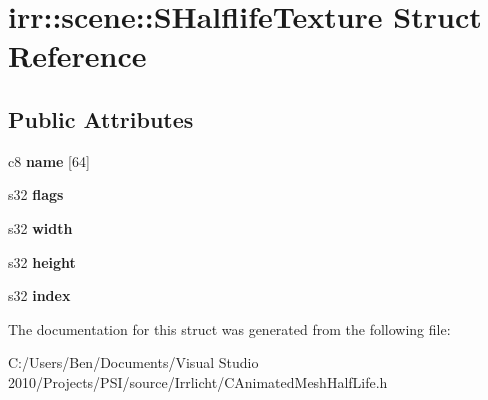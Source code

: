\hypertarget{structirr_1_1scene_1_1_s_halflife_texture}{\section{irr\-:\-:scene\-:\-:S\-Halflife\-Texture Struct Reference}
\label{structirr_1_1scene_1_1_s_halflife_texture}
}
\subsection*{Public Attributes}
\begin{DoxyCompactItemize}
\item 
\hypertarget{structirr_1_1scene_1_1_s_halflife_texture_a681a6b6fef1be257402487602f5f8a56}{c8 {\bfseries name} \mbox{[}64\mbox{]}}\label{structirr_1_1scene_1_1_s_halflife_texture_a681a6b6fef1be257402487602f5f8a56}

\item 
\hypertarget{structirr_1_1scene_1_1_s_halflife_texture_ad699edae384c2e004ede06c49d8f8c0d}{s32 {\bfseries flags}}\label{structirr_1_1scene_1_1_s_halflife_texture_ad699edae384c2e004ede06c49d8f8c0d}

\item 
\hypertarget{structirr_1_1scene_1_1_s_halflife_texture_a4336e3175b24b92ee81c5c1628c1c497}{s32 {\bfseries width}}\label{structirr_1_1scene_1_1_s_halflife_texture_a4336e3175b24b92ee81c5c1628c1c497}

\item 
\hypertarget{structirr_1_1scene_1_1_s_halflife_texture_aae466a924f45b2b4f498ac37590a417c}{s32 {\bfseries height}}\label{structirr_1_1scene_1_1_s_halflife_texture_aae466a924f45b2b4f498ac37590a417c}

\item 
\hypertarget{structirr_1_1scene_1_1_s_halflife_texture_a599f72109a0816a791b7289f74c3d06e}{s32 {\bfseries index}}\label{structirr_1_1scene_1_1_s_halflife_texture_a599f72109a0816a791b7289f74c3d06e}

\end{DoxyCompactItemize}


The documentation for this struct was generated from the following file\-:\begin{DoxyCompactItemize}
\item 
C\-:/\-Users/\-Ben/\-Documents/\-Visual Studio 2010/\-Projects/\-P\-S\-I/source/\-Irrlicht/C\-Animated\-Mesh\-Half\-Life.\-h\end{DoxyCompactItemize}
